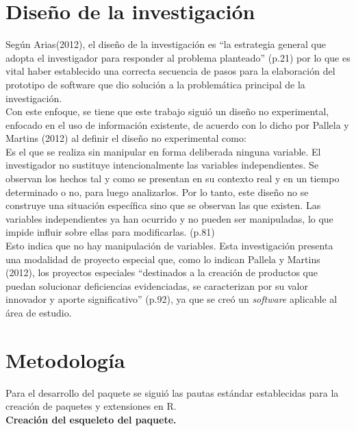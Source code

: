 	

\section{Dise\~no de la investigaci\'on}
	
Seg\'un Arias(2012), el dise\~no de la investigaci\'on es “la estrategia general que adopta el investigador para responder al problema planteado” (p.21) por lo que es vital haber establecido una correcta secuencia de pasos para la elaboraci\'on del prototipo de software que dio soluci\'on a la problem\'atica principal de la investigaci\'on.\\

Con este enfoque, se tiene que este trabajo sigui\'o un dise\~no no experimental, enfocado en el uso de informaci\'on existente, de acuerdo con lo dicho por Pallela y  Martins (2012) al definir el dise\~no no experimental como:\\

Es el que se realiza sin manipular en forma deliberada ninguna variable. El investigador no sustituye intencionalmente las variables independientes. Se observan los hechos tal y como se presentan en su contexto real y en un tiempo determinado o no, para luego analizarlos. Por lo tanto, este dise\~no no se construye una situaci\'on espec\'ifica sino que se observan las que existen. Las variables independientes ya han ocurrido y no pueden ser manipuladas, lo que impide influir sobre ellas para modificarlas. (p.81)\\

Esto indica que no hay manipulaci\'on de variables. Esta investigaci\'on presenta una modalidad de proyecto especial que, como lo indican Pallela y  Martins (2012), los proyectos especiales “destinados a la creaci\'on de productos que puedan solucionar deficiencias evidenciadas, se caracterizan por su valor innovador y aporte significativo” (p.92), ya que se cre\'o un \emph{software} aplicable al \'area de estudio.\\

\section{Metodolog\'ia}

Para el desarrollo del paquete  se sigui\'o las pautas est\'andar establecidas para la creación de paquetes y extensiones en R.\\

\noindent
\textbf{Creación del esqueleto del paquete.}\\



